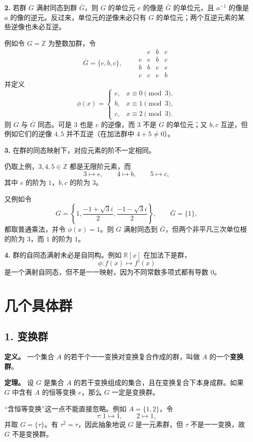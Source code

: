 \textbf{2.} 若群 $G$ 满射同态到群 $\bar G$，则 $G$ 的单位元 $e$ 的像是 $\bar G$ 的单位元，且 $a^{-1}$ 的像是 $a$ 的像的逆元。反过来，单位元的逆像未必只有 $G$ 的单位元；两个互逆元素的某些逆像也未必互逆。

例如令 $G=\mathbb Z$ 为整数加群，令
\[
\bar G=\{e,b,c\},
\qquad
\begin{array}{c|ccc}
 &e&b&c\\\hline
 e&e&b&c\\
 b&b&c&e\\
 c&c&e&b
\end{array}
\]
并定义
\[
\phi(x)=\begin{cases}
e,&x\equiv0\pmod3,\\
b,&x\equiv1\pmod3,\\
c,&x\equiv2\pmod3.
\end{cases}
\]
则 $G$ 与 $\bar G$ 同态。可是 $3$ 也是 $e$ 的逆像，而 $3$ 不是 $G$ 的单位元；又 $b,c$ 互逆，但例如它们的逆像 $4,5$ 并不互逆（在加法群中 $4+5\ne0$）。

\textbf{3.} 在群的同态映射下，对应元素的阶不一定相同。

仍取上例，$3,4,5\in\mathbb Z$ 都是无限阶元素，而
\[
3\mapsto e,\qquad4\mapsto b,\qquad5\mapsto c,
\]
其中 $e$ 的阶为 $1$，$b,c$ 的阶为 $3$。

又例如令
\[
G=\left\{1,\frac{-1+\sqrt3i}{2},\frac{-1-\sqrt3i}{2}\right\},
\qquad
\bar G=\{1\},
\]
都取普通乘法，并令 $\phi(x)=1$。则 $G$ 满射同态到 $\bar G$，但两个非平凡三次单位根的阶为 $3$，而 $1$ 的阶为 $1$。

\textbf{4.} 群的自同态满射未必是自同构。例如 $\mathbb R[x]$ 在加法下是群，
\[
\phi:f(x)\longmapsto f'(x)
\]
是一个满射自同态，但不是一一映射，因为不同常数多项式都有导数 $0$。

\section{几个具体群}

\subsection*{1. 变换群}

\textbf{定义。} 一个集合 $A$ 的若干个一一变换对变换复合作成的群，叫做 $A$ 的一个\textbf{变换群}。

\textbf{定理。} 设 $G$ 是集合 $A$ 的若干变换组成的集合，且在变换复合下本身成群。如果 $G$ 中含有 $A$ 的恒等变换 $e$，那么 $G$ 一定是变换群。

“含恒等变换”这一点不能直接忽略。例如 $A=\{1,2\}$，令
\[
\tau:1\mapsto1,\qquad2\mapsto1,
\]
并取 $G=\{\tau\}$。有 $\tau^2=\tau$，因此抽象地说 $G$ 是一元素群，但 $\tau$ 不是一一变换，故 $G$ 不是变换群。

